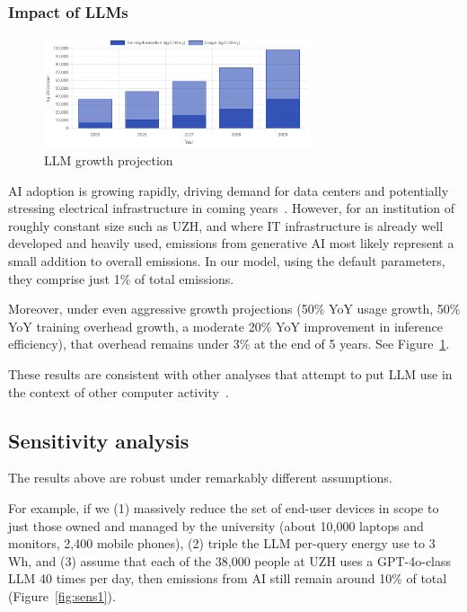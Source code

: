\documentclass[11pt]{article}
\begin{document}
\subsubsection*{Impact of LLMs}

\begin{figure}[h]
  \centering
  \includegraphics[width=0.7\textwidth]{fig-llm-growth.png}
  \caption{LLM growth projection}
  \label{fig:llm:growth}
\end{figure}

AI adoption is growing rapidly, driving demand for data centers and potentially stressing electrical infrastructure in coming years~\cite{lbl:dc:2024,iea:ai:energy}. However, for an institution of roughly constant size such as UZH, and where IT infrastructure is already well developed and heavily used, emissions from generative AI most likely represent a small addition to overall emissions. In our model, using the default parameters, they comprise just 1\% of total emissions.

Moreover, under even aggressive growth projections (50\% YoY usage growth, 50\% YoY training overhead growth, a moderate 20\% YoY improvement in inference efficiency), that overhead remains under 3\% at the end of 5 years. See Figure~\ref{fig:llm:growth}.

These results are consistent with other analyses that attempt to put LLM use in the context of other computer activity~\cite{epoch2025howmuchenergydoeschatgptuse,ritchie:chatgpt}.

\subsection{Sensitivity analysis}
\label{sec:sensitivity:analysis}

The results above are robust under remarkably different assumptions.

For example, if we (1) massively reduce the set of end-user devices in scope to just those owned and managed by the university (about 10,000 laptops and monitors, 2,400 mobile phones), (2) triple the LLM per-query energy use to 3 Wh, and (3) assume that each of the 38,000 people at UZH uses a GPT-4o-class LLM 40 times per day, then emissions from AI still remain around 10\% of total (Figure~\ref{fig:sens1}).
\end{document}
